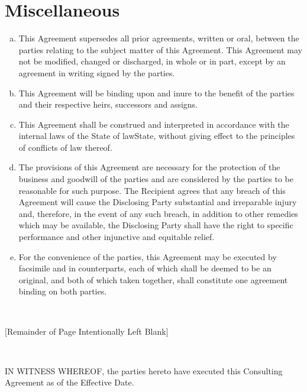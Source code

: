 \documentclass[12pt]{article}
\newcommand{\VAR}[1]{{\color{blue}#1}}
\newcommand{\BLOCK}[1]{~\newline{ \color{red}#1 }}
\begin{document}
\section{Miscellaneous}
\begin{enumerate}[a)]
\item This Agreement supersedes all prior agreements, written or oral, between the parties relating to the subject matter of this Agreement.  This Agreement may not be modified, changed or discharged, in whole or in part, except by an agreement in writing signed by the parties.
\item This Agreement will be binding upon and inure to the benefit of the parties and their respective heirs, successors and assigns.
\item This Agreement shall be construed and interpreted in accordance with the internal laws of the State of \VAR{lawState}, without giving effect to the principles of conflicts of law thereof.
\item The provisions of this Agreement are necessary for the protection of the business and goodwill of the parties and are considered by the parties to be reasonable for such purpose.  The Recipient agrees that any breach of this Agreement will cause the Disclosing Party substantial and irreparable injury and, therefore, in the event of any such breach, in addition to other remedies which may be available, the Disclosing Party shall have the right to specific performance and other injunctive and equitable relief.
\item For the convenience of the parties, this Agreement may be executed by facsimile and in counterparts, each of which shall be deemed to be an original, and both of which taken together, shall constitute one agreement binding on both parties.
\end{enumerate}

\BLOCK{if toPdf}
\vspace{1cm}
\begin{center}
[Remainder of Page Intentionally Left Blank]
\end{center}
\newpage
\BLOCK{endif}

IN WITNESS WHEREOF, the parties hereto have executed this Consulting Agreement as of the Effective Date.

\renewcommand{\arraystretch}{2}
\setlength\parindent{0pt}

\vspace{2cm}
\end{document}
